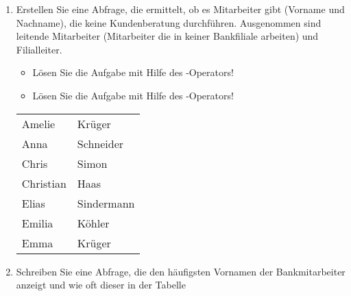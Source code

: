 \begin{enumerate}
\begin{center}
        \end{center}
        \item Erstellen Sie eine Abfrage, die ermittelt, ob es Mitarbeiter gibt
        (Vorname und Nachname), die keine Kundenberatung durchf\"uhren.
        Ausgenommen sind leitende Mitarbeiter (Mitarbeiter die in keiner
        Bankfiliale arbeiten) und Filialleiter.
        \begin{itemize}
          \item L\"osen Sie die Aufgabe mit Hilfe des -Operators!
          \item L\"osen Sie die Aufgabe mit Hilfe des -Operators!
        \end{itemize}
        \begin{center}
          \begin{small}
            \tablehead{}
            \begin{msoraclesql}
              \begin{supertabular}{ll}
                Amelie & Kr\"uger \\
                Anna & Schneider \\
                Chris & Simon \\
                Christian & Haas \\
                Elias & Sindermann \\
                Emilia & K\"ohler \\
                Emma & Kr\"uger \\
              \end{supertabular}
            \end{msoraclesql}
          \end{small}
        \end{center}
\clearpage
        \item Schreiben Sie eine Abfrage, die den h\"aufigsten Vornamen der
        Bankmitarbeiter anzeigt und wie oft dieser in der Tabelle

\end{enumerate}

